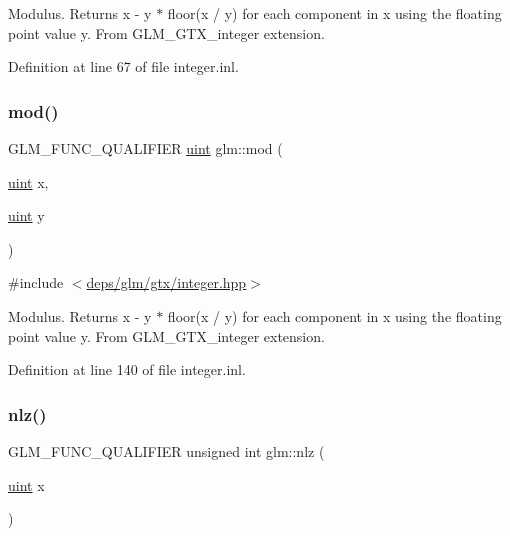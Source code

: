 Modulus. Returns x -\/ y $\ast$ floor(x / y) for each component in x using the floating point value y. From G\+L\+M\+\_\+\+G\+T\+X\+\_\+integer extension. 

Definition at line 67 of file integer.\+inl.

\mbox{\label{group__gtx__integer_gab8f9ec0ca93ca90669434224818f0750}} 
\subsubsection{\texorpdfstring{mod()}{mod()}\hspace{0.1cm}{\footnotesize\ttfamily [2/2]}}
{\footnotesize\ttfamily G\+L\+M\+\_\+\+F\+U\+N\+C\+\_\+\+Q\+U\+A\+L\+I\+F\+I\+ER \hyperlink{group__core__precision_ga4fd29415871152bfb5abd588334147c8}{uint} glm\+::mod (\begin{DoxyParamCaption}\item[{\hyperlink{group__core__precision_ga4fd29415871152bfb5abd588334147c8}{uint}}]{x,  }\item[{\hyperlink{group__core__precision_ga4fd29415871152bfb5abd588334147c8}{uint}}]{y }\end{DoxyParamCaption})}



{\ttfamily \#include $<$\hyperlink{gtx_2integer_8hpp}{deps/glm/gtx/integer.\+hpp}$>$}

Modulus. Returns x -\/ y $\ast$ floor(x / y) for each component in x using the floating point value y. From G\+L\+M\+\_\+\+G\+T\+X\+\_\+integer extension. 

Definition at line 140 of file integer.\+inl.

\mbox{\label{group__gtx__integer_gacbe62fd2384464c16ea30ecc4defc11c}} 
\subsubsection{\texorpdfstring{nlz()}{nlz()}}
{\footnotesize\ttfamily G\+L\+M\+\_\+\+F\+U\+N\+C\+\_\+\+Q\+U\+A\+L\+I\+F\+I\+ER unsigned int glm\+::nlz (\begin{DoxyParamCaption}\item[{\hyperlink{group__core__precision_ga4fd29415871152bfb5abd588334147c8}{uint}}]{x }\end{DoxyParamCaption})}



